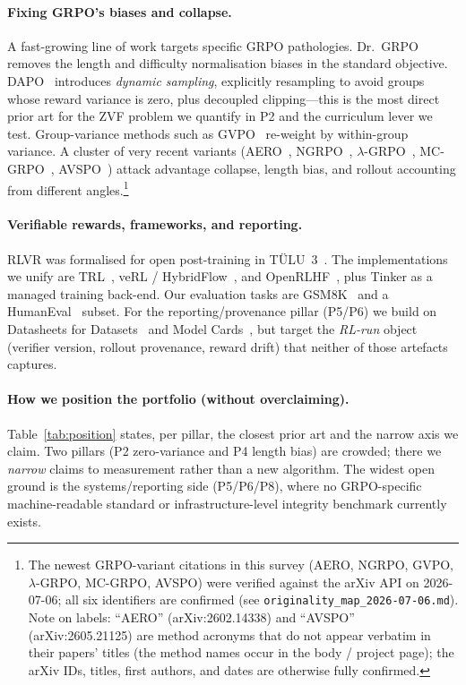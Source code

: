 \documentclass[12pt,a4paper]{report}
\begin{document}
\paragraph{Fixing GRPO's biases and collapse.}
A fast-growing line of work targets specific GRPO pathologies. Dr.\
GRPO~\cite{liu2025drgrpo} removes the length and difficulty normalisation biases
in the standard objective. DAPO~\cite{yu2025dapo} introduces \emph{dynamic
sampling}, explicitly resampling to avoid groups whose reward variance is zero,
plus decoupled clipping---this is the most direct prior art for the ZVF problem
we quantify in P2 and the curriculum lever we test. Group-variance methods such
as GVPO~\cite{gvpo2025} re-weight by within-group variance. A cluster of very
recent variants (AERO~\cite{aero2026}, NGRPO~\cite{ngrpo2025},
$\lambda$-GRPO~\cite{lambdagrpo2025}, MC-GRPO~\cite{mcgrpo2026},
AVSPO~\cite{avspo2026}) attack advantage
collapse, length bias, and rollout accounting from different angles.\footnote{The
newest GRPO-variant citations in this survey (AERO, NGRPO, GVPO, $\lambda$-GRPO,
MC-GRPO, AVSPO) were verified against the arXiv API on 2026-07-06; all six
identifiers are confirmed (see \texttt{originality\_map\_2026-07-06.md}). Note on
labels: ``AERO'' (arXiv:2602.14338) and ``AVSPO'' (arXiv:2605.21125) are method
acronyms that do not appear verbatim in their papers' titles (the method names
occur in the body / project page); the arXiv IDs, titles, first authors, and dates
are otherwise fully confirmed.}

\paragraph{Verifiable rewards, frameworks, and reporting.}
RLVR was formalised for open post-training in TÜLU~3~\cite{lambert2024tulu3}. The
implementations we unify are TRL~\cite{vonwerra2020trl}, veRL /
HybridFlow~\cite{sheng2024hybridflow}, and OpenRLHF~\cite{hu2024openrlhf}, plus
Tinker as a managed training back-end. Our evaluation tasks are
GSM8K~\cite{cobbe2021gsm8k} and a HumanEval~\cite{chen2021humaneval} subset. For
the reporting/provenance pillar (P5/P6) we build on Datasheets for
Datasets~\cite{gebru2021datasheets} and Model Cards~\cite{mitchell2019modelcards},
but target the \emph{RL-run} object (verifier version, rollout provenance, reward
drift) that neither of those artefacts captures.

\paragraph{How we position the portfolio (without overclaiming).}
Table~\ref{tab:position} states, per pillar, the closest prior art and the
narrow axis we claim. Two pillars (P2 zero-variance and P4 length bias) are
crowded; there we \emph{narrow} claims to measurement rather than a new
algorithm. The widest open ground is the systems/reporting side (P5/P6/P8),
where no GRPO-specific machine-readable standard or infrastructure-level
integrity benchmark currently exists.
\end{document}
